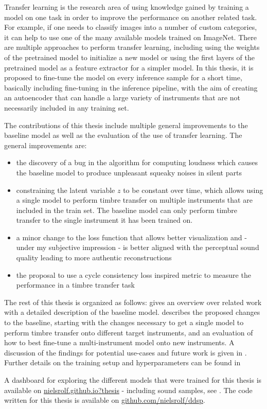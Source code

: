 Transfer learning is the research area of using knowledge gained by training a model on one task in order to improve the performance on another related task. For example, if one needs to classify images into a number of custom categories, it can help to use one of the many available models trained on ImageNet.
There are multiple approaches to perform transfer learning, including using the weights of the pretrained model to initialize a new model or using the first layers of the pretrained model as a feature extractor for a simpler model. \newline
In this thesis, it is proposed to fine-tune the model on every inference sample for a short time, basically including fine-tuning in the inference pipeline, with the aim of creating an autoencoder that can handle a large variety of instruments that are not necessarily included in any training set. \newline

The contributions of this thesis include multiple general improvements to the baseline model as well as the evaluation of the use of transfer learning.
The general improvements are:
\begin{itemize}
    \item the discovery of a bug in the algorithm for computing loudness which causes the baseline model to produce unpleasant squeaky noises in silent parts
    \item constraining the latent variable $z$ to be constant over time, which allows using a single model to perform timbre transfer on multiple instruments that are included in the train set. The baseline model can only perform timbre transfer to the single instrument it has been trained on.
    \item a minor change to the loss function that allows better visualization and - under my subjective impression - is better aligned with the perceptual sound quality leading to more authentic reconstructions
    \item the proposal to use a cycle consistency loss inspired metric to measure the performance in a timbre transfer task
\end{itemize}

The rest of this thesis is organized as follows:  gives an overview over related work with a detailed description of the baseline model.  describes the proposed changes to the baseline, starting with the changes necessary to get a single model to perform timbre transfer onto different target instruments, and an evaluation of how to best fine-tune a multi-instrument model onto new instruments. A discussion of the findings for potential use-cases and future work is given in . Further details on the training setup and hyperparameters can be found in 
\newline

A dashboard for exploring the different models that were trained for this thesis is available on \href{https://nielsrolf.github.io?thesis}{nielsrolf.github.io?thesis} - including sound samples, see .
The code written for this thesis is available on \href{https://github.com/nielsrolf/ddsp}{github.com/nielsrolf/ddsp}.
